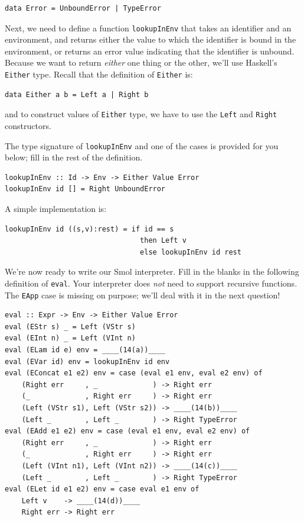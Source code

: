 \documentclass[addpoints]{exam}
\begin{document}
\begin{questions}
\begin{verbatim}
data Error = UnboundError | TypeError
\end{verbatim}

Next, we need to define a function \verb|lookupInEnv| that takes an identifier and an environment, and returns either the value to which the identifier is bound in the environment, or returns an error value indicating that the identifier is unbound.  Because we want to return \emph{either} one thing or the other, we'll use Haskell's \verb|Either| type.  Recall that the definition of \verb|Either| is:

\begin{verbatim}
data Either a b = Left a | Right b
\end{verbatim}

and to construct values of \verb|Either| type, we have to use the \verb|Left| and \verb|Right| constructors.

\question[4] The type signature of \verb|lookupInEnv| and one of the cases is provided for you below; fill in the rest of the definition.

\begin{verbatim}
lookupInEnv :: Id -> Env -> Either Value Error
lookupInEnv id [] = Right UnboundError
\end{verbatim}
\begin{solutionorbox}[\stretch{1}]
A simple implementation is:
\begin{verbatim}
lookupInEnv id ((s,v):rest) = if id == s
                                then Left v
                                else lookupInEnv id rest
\end{verbatim}
\end{solutionorbox}

\newpage

\question We're now ready to write our Smol interpreter.  Fill in the blanks in the following definition of \verb|eval|.  Your interpreter does \emph{not} need to support recursive functions. The \verb|EApp| case is missing on purpose; we'll deal with it in the next question!
  
\begin{verbatim}
eval :: Expr -> Env -> Either Value Error
eval (EStr s) _ = Left (VStr s)
eval (EInt n) _ = Left (VInt n)
eval (ELam id e) env = ____(14(a))____
eval (EVar id) env = lookupInEnv id env
eval (EConcat e1 e2) env = case (eval e1 env, eval e2 env) of
    (Right err     , _             ) -> Right err
    (_             , Right err     ) -> Right err
    (Left (VStr s1), Left (VStr s2)) -> ____(14(b))____
    (Left _        , Left _        ) -> Right TypeError
eval (EAdd e1 e2) env = case (eval e1 env, eval e2 env) of
    (Right err     , _             ) -> Right err
    (_             , Right err     ) -> Right err
    (Left (VInt n1), Left (VInt n2)) -> ____(14(c))____
    (Left _        , Left _        ) -> Right TypeError   
eval (ELet id e1 e2) env = case eval e1 env of
    Left v    -> ____(14(d))____
    Right err -> Right err
\end{verbatim}


\end{questions}
\end{document}
